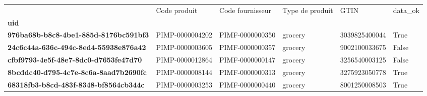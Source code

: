 \begin{tabularx}{\linewidth}{lXXXXX}
\toprule
{} &     Code produit & Code fournisseur & Type de produit &           GTIN &  data\_ok \\
\textbf{uid                                 } &                  &                  &                 &                &          \\
\midrule
\textbf{976ba68b-b8c8-4be1-885d-8176bc591bf3} &  PIMP-0000004202 &  PIMF-0000000350 &         grocery &  3039825400044 &     True \\
\textbf{24c6c44a-636c-494c-8ed4-55938e876a42} &  PIMP-0000003605 &  PIMF-0000000357 &         grocery &  9002100033675 &    False \\
\textbf{cfbf9793-4e5f-48e7-8dc0-d7653fe47d70} &  PIMP-0000012864 &  PIMF-0000000147 &         grocery &  3256540003125 &    False \\
\textbf{8bcddc40-d795-4c7e-8c6a-8aad7b2690fc} &  PIMP-0000008144 &  PIMF-0000000313 &         grocery &  3275923050778 &     True \\
\textbf{68318fb3-b8cd-483f-8348-bf8564cb344c} &  PIMP-0000003253 &  PIMF-0000000440 &         grocery &  8001250008503 &     True \\
\bottomrule
\end{tabularx}

